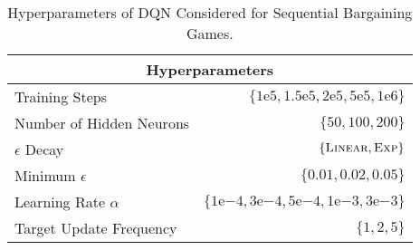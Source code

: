 \begin{table}[h!]
    \centering
    \begin{tabular}{|l||r|}
    \hline
    \multicolumn{2}{|c|}{Hyperparameters} \\
    \hline
        Training Steps & $\{ 1\mathrm{e}{5}, 1.5\mathrm{e}{5}, 2\mathrm{e}{5}, 5\mathrm{e}{5}, 1\mathrm{e}{6} \}$ \\
        Number of Hidden Neurons & $\{ 50, 100, 200 \}$ \\
        $\epsilon$ Decay & $\{ \textsc{Linear}, \textsc{Exp} \}$ \\
        Minimum $\epsilon$ & $\{ 0.01, 0.02, 0.05 \}$ \\
        Learning Rate $\alpha$ & $\{ 1\mathrm{e}{-4}, 3\mathrm{e}{-4}, 5\mathrm{e}{-4}, 1\mathrm{e}{-3}, 3\mathrm{e}{-3} \}$ \\
        Target Update Frequency & $\{ 1, 2, 5 \}$ \\
    \hline
    \end{tabular}
    \vspace{1em}
    \caption{Hyperparameters of DQN Considered for Sequential Bargaining Games.}
    \label{tab:DQN_considered_hyper}
\end{table}
